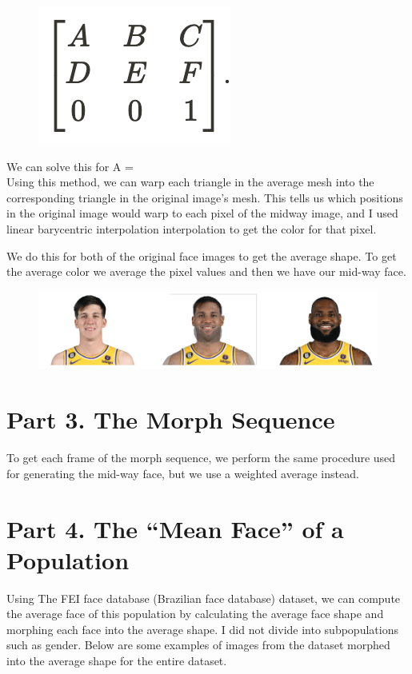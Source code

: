 \documentclass{article}
\begin{document}
\begin{figure}[!htb]
    \centering
    \includegraphics[scale=0.5]{im3.png}
\end{figure}
\newpage
We can solve this for A = \\

Using this method, we can warp each triangle in the average mesh into the corresponding triangle in the original image’s mesh. This tells us which positions in the original image would warp to each pixel of the midway image, and I used linear barycentric interpolation interpolation to get the color for that pixel.

We do this for both of the original face images to get the average shape. To get the average color we average the pixel values and then we have our mid-way face.


\begin{figure}[!htb]
    \centering
    \includegraphics[scale=0.5]{im4.png}
\end{figure}
\newpage


\section{Part 3. The Morph Sequence}
To get each frame of the morph sequence, we perform the same procedure used for generating the mid-way face, but we use a weighted average instead.



\section{Part 4. The “Mean Face” of a Population}
Using The FEI face database (Brazilian face database) dataset, we can compute the average face of this population by calculating the average face shape and morphing each face into the average shape. I did not divide into subpopulations such as gender. Below are some examples of images from the dataset morphed into the average shape for the entire dataset.
\end{document}
